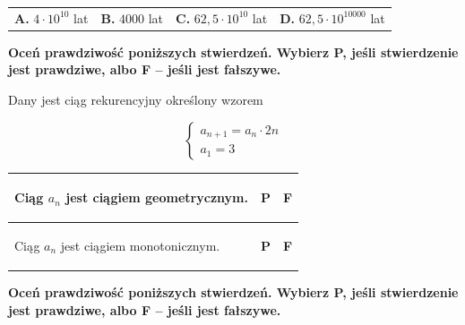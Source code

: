 \documentclass[12pt,a4paper]{article}
\theoremstyle{break}
\begin{document}
	\vspace{0.5cm}
	\begin{tabular}{p{3.5cm} p{3.5cm} p{3.5cm} p{3.5cm}}
		\textbf{A. }$4\cdot10^{10}$ lat&
		\textbf{B. }$4000$ lat&
		\textbf{C. }$62,5\cdot10^{10}$ lat&
		\textbf{D. }$62,5\cdot 10^{10000} $ lat\\
	\end{tabular}
	\newpage
	
	
	\begin{zad}[0-1]
		\textbf{Oceń prawdziwość poniższych stwierdzeń. Wybierz P, jeśli stwierdzenie jest prawdziwe, albo F – jeśli jest fałszywe.}
	\end{zad} 
	
	Dany jest ciąg rekurencyjny określony wzorem
	
	$$\left\{\begin{array}{l}
		a_{n+1}=a_n\cdot2n\\
		a_1=3
	\end{array}\right.$$
	
	\vspace{0.5cm}
	\begin{tabular}{|p{12.5cm}|p{1cm}|p{1cm}|}

		\hline
		\begin{flushleft}
			Ciąg $a_n$ jest ciągiem geometrycznym.
		\end{flushleft}&\begin{center}
			\textbf{P}
		\end{center}&\begin{center}
		\textbf{F}
	\end{center}\\
		\hline
		\begin{flushleft}
			Ciąg $a_n$ jest ciągiem monotonicznym.
		\end{flushleft}&\begin{center}
			\textbf{P}
		\end{center}&\begin{center}
			\textbf{F}
		\end{center}\\
		\hline
	\end{tabular}

	
	\begin{zad}[0-1]
		\textbf{Oceń prawdziwość poniższych stwierdzeń. Wybierz P, jeśli stwierdzenie jest prawdziwe, albo F – jeśli jest fałszywe.}
	\end{zad} 
\end{document}
